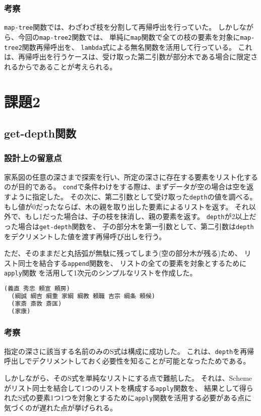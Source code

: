 \documentclass[11pt,a4paper, uplatex]{jsarticle}
\begin{document}
\subsubsection{考察}
\texttt{map-tree}関数では、わざわざ枝を分割して再帰呼出を行っていた。
しかしながら、今回の\texttt{map-tree2}関数では、
単純に\texttt{map}関数で全ての枝の要素を対象に\texttt{map-tree2}関数再帰呼出を、
\texttt{lambda}式による無名関数を活用して行っている。
これは、再帰呼出を行うケースは、受け取った第二引数が部分木である場合に限定されるからであることが考えられる。


\section{課題2}
\subsection{get-depth関数}
\subsubsection{設計上の留意点}
家系図の任意の深さまで探索を行い、所定の深さに存在する要素をリスト化するのが目的である。
\texttt{cond}で条件わけをする際は、まずデータが空の場合は空を返すように指定した。
その次に、第二引数として受け取った\texttt{depth}の値を調べる。
もし値が0だったならば、木の親を取り出した要素によるリストを返す。
それ以外で、もし1だった場合は、子の枝を抹消し、親の要素を返す。
\texttt{depth}が2以上だった場合は\texttt{get-depth}関数を、
子の部分木を第一引数として、第二引数は\texttt{depth}をデクリメントした値を渡す再帰呼び出しを行う。

ただ、そのままだと丸括弧が無駄に残ってしまう(空の部分木が残る)ため、
リスト同士を結合する\texttt{append}関数を、
リストの全ての要素を対象とするために\texttt{apply}関数
を活用して1次元のシンプルなリストを作成した。
\begin{lstlisting}[language=lisp, caption=\texttt{get-depth}関数実行例()]
  (義直 秀忠 頼宣 頼房)
  (綱誠 綱吉 綱重 家綱 綱教 頼職 吉宗 綱条 頼候)
  (家斎 斎敦 斎匡)
  (家康)
\end{lstlisting}
\subsubsection{考察}
指定の深さに該当する名前のみのS式は構成に成功した。
これは、\texttt{depth}を再帰呼出しでデクリメントしておく必要性を知ることが可能となったためである。

しかしながら、そのS式を単純なリストにする点で難航した。
それは、Schemeがリスト同士を結合して1つのリストを構成する\texttt{apply}関数を、
結果として得られたS式の要素1つ1つを対象とするために\texttt{apply}関数を活用する必要がある点に
気づくのが遅れた点が挙げられる。
\end{document}

